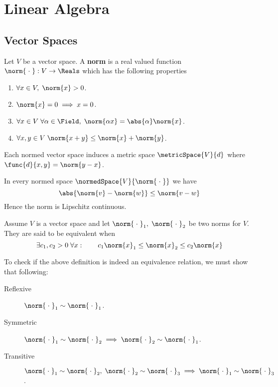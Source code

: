 \chapter{Linear Algebra}
\section{Vector Spaces}

\begin{definition}
    Let \(V\) be a vector space. A \textbf{norm} is a real valued function \(\norm{ \scdot }: V \to \Reals\) which has the following properties
    \begin{enumerate}
        \item \(\forall x \in V, \; \norm{x} > 0\).
        \item \(\norm{x} = 0 \implies x = 0\).
        \item \(\forall x \in V \; \forall \alpha \in \Field, \; \norm{\alpha x} = \abs{\alpha} \norm{x}\).
        \item \(\forall x,y \in V \; \norm{x+y} \leq \norm{x} + \norm{y}\).
    \end{enumerate}
\end{definition}

Each normed vector space induces a metric space \(\metricSpace{V}{d}\) where \(\func{d}{x,y} = \norm{y - x}\).

\begin{theorem}
    In every normed space \(\normedSpace{V}{\norm{\scdot}}\) we have
    \begin{equation*}
        \abs{ {\norm{v} - \norm{w}}} \leq \norm{v - w}
    \end{equation*}
    Hence the norm is Lipschitz continuous.
\end{theorem}


\begin{definition}
    Assume \(V\) is a vector space and let \(\norm{\scdot}_1, \; \norm{\scdot}_2\) be two norms for \(V\). They are said to be equivalent when
    \begin{equation*}
        \exists c_1,c_2 > 0 \; \forall x : \qquad c_1 \norm{x}_1 \leq \norm{x}_2 \leq c_2 \norm{x}
    \end{equation*}
\end{definition}

To check if the above definition is indeed an equivalence relation, we must show that following:
\begin{description}
    \item [Reflexive] \(\norm{\scdot}_1 \sim \norm{\scdot}_1\).
    \item [Symmetric] \(\norm{\scdot}_1 \sim \norm{\scdot}_2 \implies \norm{\scdot}_2 \sim \norm{\scdot}_1\).
    \item [Transitive] \( \norm{\scdot}_1 \sim \norm{\scdot}_2 , \; \norm{\scdot}_2 \sim \norm{\scdot}_3 \implies \norm{\scdot}_1 \sim \norm{\scdot}_3\).
\end{description}

